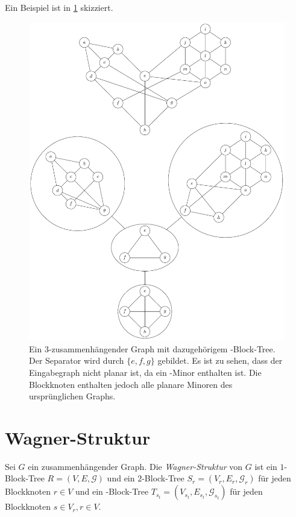 Ein Beispiel ist in \Abb \ref{fig:33-Block-Tree} skizziert.
\begin{figure}[H]
  \centering
  \includegraphics[width=\textwidth,height=\textheight,keepaspectratio]{bilder/33-Block-Tree.pdf}
  \caption{Ein $3$-zusammenhängender Graph mit dazugehörigem \dd-Block-Tree.
           Der Separator wird durch $\{e, f, g\}$ gebildet.
           Es ist zu sehen, dass der Eingabegraph nicht planar ist, da ein \kdd-Minor enthalten ist.
           Die Blockknoten enthalten jedoch alle planare Minoren des ursprünglichen Graphs.}
  \label{fig:33-Block-Tree}
\end{figure}


\section{Wagner-Struktur}
\begin{definition}\label{eq:WagnerStruktur}
  Sei $G$ ein zusammenhängender Graph.
  Die \emph{Wagner-Struktur} von $G$ ist ein $1$-Block-Tree $R = (V, E, \mathcal{G})$ und ein $2$-Block-Tree $S_r = (V_r, E_r, \mathcal{G}_r)$ für jeden Blockknoten $r \in V$ und ein \dd-Block-Tree $T_{s_t} = (V_{s_t}, E_{s_t}, \mathcal{G}_{s_t})$ für jeden Blockknoten $s \in V_r, r \in V$.
\end{definition}

